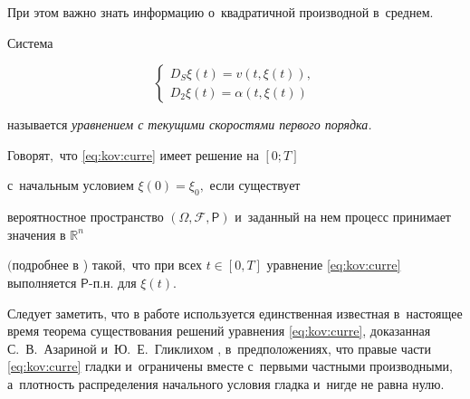 При этом важно знать информацию о~квадратичной производной в~среднем.



 Система

\begin{equation}\label{eq:kov:curre}

    \left\{

        \begin{array}{l}

            D_S\xi(t)=v(t,\xi(t)),\\

            D_2\xi(t)=\alpha(t,\xi(t))

        \end{array}

    \right.

\end{equation}

называется \emph{уравнением с текущими скоростями первого порядка.}



\smallskip



\begin{definition}[1]\label{eq:kov:thrm11}{Говорят$,$ что \eqref{eq:kov:curre} имеет решение на $[0;T]$

    с~начальным условием $\xi(0)=\xi_0,$ если существует

    вероятностное пространство $(\Omega,\mathcal{F},\mathsf{P})$ и~заданный на нем процесс принимает значения в $\mathbb{R}^n$

$($подробнее в {\rm \cite{popovkoval:bib:AG1})} такой$,$ что при всех $t\in

[0,T]$ уравнение \eqref{eq:kov:curre} выполняется        $\mathsf{P}$-п.н. для $\xi(t)$.}

\end{definition}



\smallskip



Следует заметить, что в работе используется единственная известная в~настоящее время теорема существования решений уравнения \eqref{eq:kov:curre}, доказанная С.~В.~Азариной и~Ю.~Е.~Гликлихом \cite[теорема~3]{popovkoval:bib:AG1}, в~предположениях, что правые части \eqref{eq:kov:curre} гладки и~ограничены вместе с~первыми частными производными,  а~плотность распределения начального условия гладка и~нигде не равна нулю.



